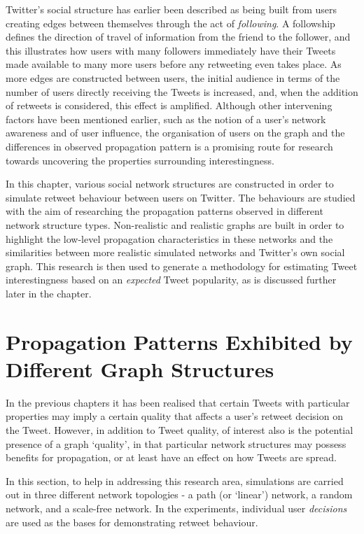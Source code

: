 Twitter's social structure has earlier been described as being built from users creating edges between themselves through the act of \textit{following}. A followship defines the direction of travel of information from the friend to the follower, and this illustrates how users with many followers immediately have their Tweets made available to many more users before any retweeting even takes place. As more edges are constructed between users, the initial audience in terms of the number of users directly receiving the Tweets is increased, and, when the addition of retweets is considered, this effect is amplified. Although other intervening factors have been mentioned earlier, such as the notion of a user's network awareness and of user influence, the organisation of users on the graph and the differences in observed propagation pattern is a promising route for research towards uncovering the properties surrounding interestingness.

In this chapter, various social network structures are constructed in order to simulate retweet behaviour between users on Twitter. The behaviours are studied with the aim of researching the propagation patterns observed in different network structure types. Non-realistic and realistic graphs are built in order to highlight the low-level propagation characteristics in these networks and the similarities between more realistic simulated networks and Twitter's own social graph. This research is then used to generate a methodology for estimating Tweet interestingness based on an \textit{expected} Tweet popularity, as is discussed further later in the chapter.

\section{Propagation Patterns Exhibited by Different Graph Structures}
In the previous chapters it has been realised that certain Tweets with particular properties may imply a certain quality that affects a user's retweet decision on the Tweet. However, in addition to Tweet quality, of interest also is the potential presence of a graph `quality', in that particular network structures may possess benefits for propagation, or at least have an effect on how Tweets are spread.


In this section, to help in addressing this research area, simulations are carried out in three different network topologies - a path (or `linear') network, a random network, and a scale-free network. In the experiments, individual user \textit{decisions} are used as the bases for demonstrating retweet behaviour.  

